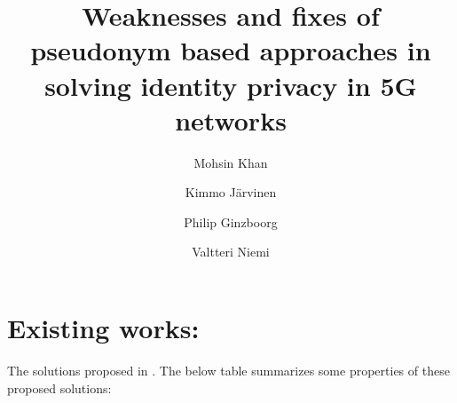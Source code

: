 \documentclass[runningheads,a4paper]{llncs} %
\begin{document}
\mainmatter  %

\title{Weaknesses and fixes of pseudonym based approaches in solving identity privacy in 5G networks}


%
%
\author{Mohsin Khan%
\and Kimmo J\"arvinen
\and Philip Ginzboorg
\and Valtteri Niemi \\
}  %



%
%

\maketitle


\begin{abstract}

\end{abstract}
\section{Existing works:}
The solutions proposed in \citep{pseudonym_valtteri_philip,pseudonym_ericsson,ccs_15,SSR 2015}. The below table summarizes some properties of these proposed solutions:
\end{document}
